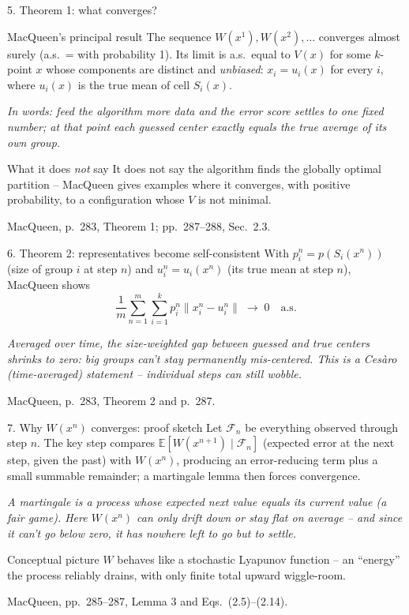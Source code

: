 \documentclass[10pt,compress]{beamer}
\newcommand{\E}{\mathbb{E}}
\newcommand{\norm}[1]{\lVert #1\rVert}
\newcommand{\defline}[1]{{\footnotesize\textcolor{aggiemaroon}{\textit{#1}}\par}}
\begin{document}
\begin{frame}{5. Theorem 1: what converges?}
\begin{block}{\footnotesize MacQueen's principal result}
\small The sequence $W(x^1),W(x^2),\ldots$ converges almost surely (a.s.\ = with probability 1). Its limit is a.s.\ equal to $V(x)$ for some $k$-point $x$ whose components are distinct and \emph{unbiased}: $x_i=u_i(x)$ for every $i$, where $u_i(x)$ is the true mean of cell $S_i(x)$.
\end{block}
\defline{In words: feed the algorithm more data and the error score settles to one fixed number; at that point each guessed center exactly equals the true average of its own group.}
\begin{alertblock}{\footnotesize What it does \emph{not} say}
\small It does not say the algorithm finds the globally optimal partition -- MacQueen gives examples where it converges, with positive probability, to a configuration whose $V$ is not minimal.
\end{alertblock}
\vfill
{\scriptsize MacQueen, p.~283, Theorem 1; pp.~287--288, Sec.~2.3.}
\end{frame}

\begin{frame}{6. Theorem 2: representatives become self-consistent}
With $p_i^n=p(S_i(x^n))$ (size of group $i$ at step $n$) and $u_i^n=u_i(x^n)$ (its true mean at step $n$), MacQueen shows
\[
\frac{1}{m}\sum_{n=1}^{m}\sum_{i=1}^{k}
 p_i^n\norm{x_i^n-u_i^n}\;\longrightarrow\;0 \quad\text{a.s.}
\]
\defline{Averaged over time, the size-weighted gap between guessed and true centers shrinks to zero: big groups can't stay permanently mis-centered. This is a Ces\`aro (time-averaged) statement -- individual steps can still wobble.}
\vfill
{\scriptsize MacQueen, p.~283, Theorem 2 and p.~287.}
\end{frame}

\begin{frame}{7. Why $W(x^n)$ converges: proof sketch}
Let $\mathcal F_n$ be everything observed through step $n$. The key step compares $\E[W(x^{n+1})\mid\mathcal F_n]$ (expected error at the next step, given the past) with $W(x^n)$, producing an error-reducing term plus a small summable remainder; a martingale lemma then forces convergence.
\defline{A martingale is a process whose expected next value equals its current value (a fair game). Here $W(x^n)$ can only drift down or stay flat on average -- and since it can't go below zero, it has nowhere left to go but to settle.}
\begin{block}{Conceptual picture}
\small $W$ behaves like a stochastic Lyapunov function -- an ``energy'' the process reliably drains, with only finite total upward wiggle-room.
\end{block}
\vfill
{\scriptsize MacQueen, pp.~285--287, Lemma 3 and Eqs.~(2.5)--(2.14).}
\end{frame}
\end{document}

